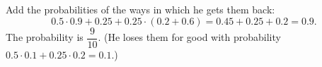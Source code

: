 Add the probabilities of the ways in which he gets them back:
\[0.5\cdot0.9+0.25+0.25\cdot(0.2+0.6)=0.45+0.25+0.2=0.9.\]
The probability is $\boxed{\dfrac{9}{10}}$. (He loses them for good with probability $0.5\cdot0.1+0.25\cdot0.2=0.1$.)

